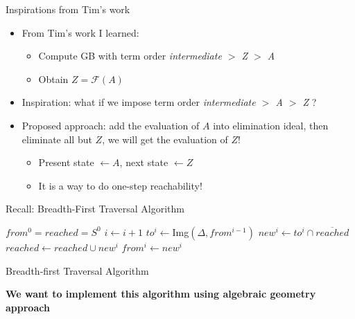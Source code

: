 \documentclass[xcolor=dvipsnames]{beamer}
\newcommand{\bi}{\begin{itemize}}
\newcommand{\ei}{\end{itemize}}
\begin{document}
\begin{frame}{\large{Inspirations from Tim's work}}
 \vspace{-0.1in}
\begin{figure}[hbt]
\end{figure}
 \vspace{-1in}
\bi
\item From Tim's work I learned:
	\bi
	\item Compute GB with term order {\it intermediate $>$ Z $>$ A}
	\item Obtain $Z = \mathcal F(A)$
	\ei
\item Inspiration: what if we impose term order {\it intermediate $>$ A $>$ Z} ?
\item Proposed approach: add the evaluation of $A$ into elimination ideal, then eliminate all but $Z$, we will get the 
\alert{evaluation of $Z$}!
	\bi
	\item Present state $\gets A$, next state $\gets Z$
	\item It is a way to do \alert{one-step reachability}!
	\ei
\ei
\end{frame}

\begin{frame}{\large{Recall: Breadth-First Traversal Algorithm}}
\begin{algorithm}[H]
\SetAlgoNoLine
  $from^0 = reached = S^0$\;
  {
  	$i \gets i + 1$\;
	$to^i \gets$Img$(\Delta, from^{i-1})$\;
	$new^i \gets to^i \cap \overline{reached}$\;
  	$reached \gets reached \cup new^i$\;
	$from^i \gets new^i$\;
  }
\caption {Breadth-first Traversal Algorithm}
\end{algorithm}
\vspace{0.2in}
\textbf{We want to implement this algorithm using algebraic geometry approach}
\end{frame}
\end{document}

